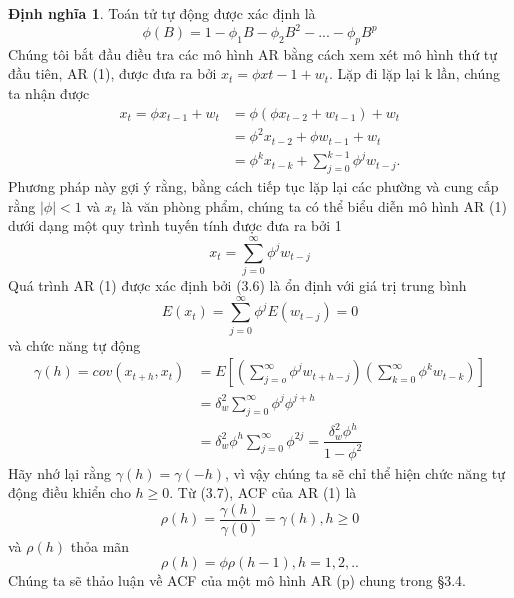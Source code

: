\documentclass[12pt, a4paper,oneside]{book}
\theoremstyle{definition}
\newtheorem{dn}[theo]{Định nghĩa}
\begin{document}
\begin{dn}
	Toán tử tự động được xác định là
	$$\phi(B) = 1-\phi_{1}B - \phi_{2}B^{2}- ...- \phi_{p}B^{p}$$
	Chúng tôi bắt đầu điều tra các mô hình AR bằng cách xem xét mô hình thứ tự đầu tiên, AR (1), được đưa ra bởi $x_{t} = \phi x{t-1} + w_{t}$. Lặp đi lặp lại k lần, chúng ta nhận được
	\begin{align*}
	x_{t}=\phi x_{t-1} +w_{t} &= \phi(\phi x_{t-2} +w_{t-1}) +w_{t}\\&= \phi^{2}x_{t-2} + \phi w_{t-1} +w_{t}\\&= \phi^{k}x_{t-k} + \sum_{j=0}^{k-1}\phi^{j}w_{t-j}.
	\end{align*}
	Phương pháp này gợi ý rằng, bằng cách tiếp tục lặp lại các phường và cung cấp rằng $| \phi | <1$ và $x_{t}$ là văn phòng phẩm, chúng ta có thể biểu diễn mô hình AR (1) dưới dạng một quy trình tuyến tính được đưa ra bởi 1
	$$x_{t}= \sum_{j=0}^{\infty} \phi^{j}w_{t-j}$$
	Quá trình AR (1) được xác định bởi (3.6) là ổn định với giá trị trung bình
	$$E(x_{t})= \sum_{j=0}^{\infty}\phi^{j} E(w_{t-j})=0$$
	và chức năng tự động
	\begin{align*}
	\gamma(h)= cov(x_{t+h},x_{t}) &=E[(\sum_{j=o}^{\infty}\phi^{j}w_{t+h-j})(\sum_{k=0}^{\infty}\phi^{k}w_{t-k})]\\&= \delta_{w}^{2} \sum_{j=0}^{\infty} \phi^{j}\phi^{j+h}\\& = \delta_{w}^{2}\phi^{h} \sum_{j=0}^{\infty}\phi^{2j}= \dfrac{\delta_{w}^{2}\phi^{h}}{1- \phi^{2}}
	\end{align*}
	Hãy nhớ lại rằng $\gamma(h) = \gamma (-h)$, vì vậy chúng ta sẽ chỉ thể hiện chức năng tự động điều khiển cho $h \geq 0$. Từ (3.7), ACF của AR (1) là
	$$\rho(h)= \dfrac{\gamma(h)}{\gamma(0)}= \gamma(h), h\geq 0$$
	và $\rho(h)$ thỏa mãn
	$$\rho(h)= \phi \rho(h-1), h=1,2,..$$
	Chúng ta sẽ thảo luận về ACF của một mô hình AR (p) chung trong §3.4.
	

\end{dn}
\end{document}
